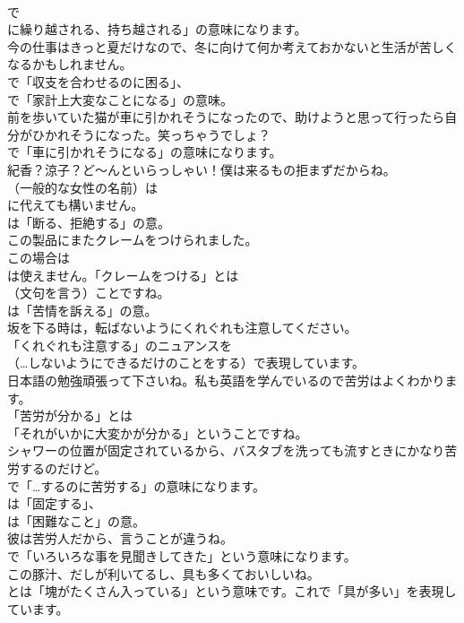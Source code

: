 \documentclass[8pt]{extreport}
\begin{document}
\begin{CJK}{UTF8}{min}
\\	で
\\	に繰り越される、持ち越される」の意味になります。	
\\	今の仕事はきっと夏だけなので、冬に向けて何か考えておかないと生活が苦しくなるかもしれません。 
\\	で「収支を合わせるのに困る」、
\\	で「家計上大変なことになる」の意味。	
\\	前を歩いていた猫が車に引かれそうになったので、助けようと思って行ったら自分がひかれそうになった。笑っちゃうでしょ？ 
\\	で「車に引かれそうになる」の意味になります。	
\\	紀香？涼子？ど～んといらっしゃい！僕は来るもの拒まずだからね。 
\\	（一般的な女性の名前）は
\\	に代えても構いません。
\\	は「断る、拒絶する」の意。	
\\	この製品にまたクレームをつけられました。 
\\	この場合は 
\\	は使えません。「クレームをつける」とは 
\\	（文句を言う）ことですね。
\\	は「苦情を訴える」の意。	
\\	坂を下る時は，転ばないようにくれぐれも注意してください。 
\\	「くれぐれも注意する」のニュアンスを 
\\	（…しないようにできるだけのことをする）で表現しています。	
\\	日本語の勉強頑張って下さいね。私も英語を学んでいるので苦労はよくわかります。 
\\	「苦労が分かる」とは
\\	「それがいかに大変かが分かる」ということですね。	
\\	シャワーの位置が固定されているから、バスタブを洗っても流すときにかなり苦労するのだけど。 
\\	で「…するのに苦労する」の意味になります。
\\	は「固定する」、
\\	は「困難なこと」の意。	
\\	彼は苦労人だから、言うことが違うね。 
\\	で「いろいろな事を見聞きしてきた」という意味になります。	
\\	この豚汁、だしが利いてるし、具も多くておいしいね。 
\\	とは「塊がたくさん入っている」という意味です。これで「具が多い」を表現しています。

\end{CJK}
\end{document}
